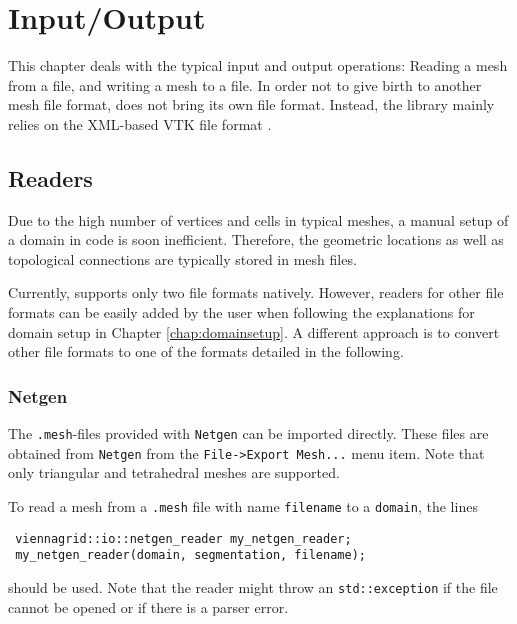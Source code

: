 \chapter{Input/Output} \label{chap:io}

This chapter deals with the typical input and output operations: Reading a mesh from a file, and writing a mesh to a file.
In order not to give birth to another mesh file format, {\ViennaGrid} does not bring its own file format. 
Instead, the library mainly relies on the XML-based VTK \cite{VTK} file format \cite{VTKfileformat}.




\section{Readers}
Due to the high number of vertices and cells in typical meshes,
a manual setup of a domain in code is soon inefficient. Therefore,
the geometric locations as well as topological connections are typically stored in mesh files.

Currently, {\ViennaGrid} supports only two file formats natively. However, readers for other file formats
can be easily added by the user when following the explanations for domain setup in Chapter \ref{chap:domainsetup}.
A different approach is to convert other file formats to one of the formats detailed in the following.


 \subsection{Netgen}
 The \texttt{.mesh}-files provided with \texttt{Netgen} \cite{netgen} can be imported directly.
 These files are obtained from \texttt{Netgen} from the \texttt{File->Export Mesh...} menu item. Note that only triangular and tetrahedral meshes are supported.

 To read a mesh from a \texttt{.mesh} file with name \lstinline|filename| to a \lstinline|domain|, the lines
 \begin{lstlisting}
 viennagrid::io::netgen_reader my_netgen_reader;
 my_netgen_reader(domain, segmentation, filename);
 \end{lstlisting}
 should be used. Note that the reader might throw an \lstinline|std::exception| if the file cannot be opened or if there is a parser error.

